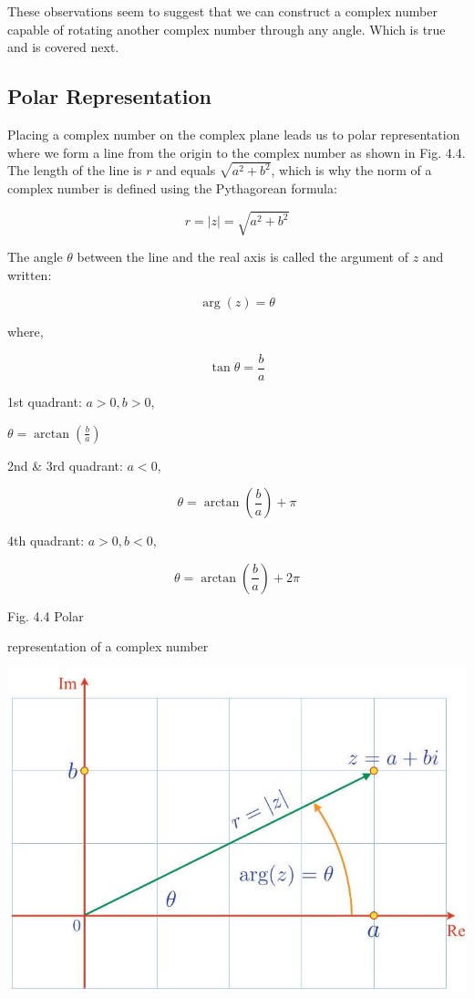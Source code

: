 \documentclass[10pt]{article}
\begin{document}
These observations seem to suggest that we can construct a complex number capable of rotating another complex number through any angle. Which is true and is covered next.

\subsection{Polar Representation}
Placing a complex number on the complex plane leads us to polar representation where we form a line from the origin to the complex number as shown in Fig. 4.4. The length of the line is $r$ and equals $\sqrt{a^{2}+b^{2}}$, which is why the norm of a complex number is defined using the Pythagorean formula:

$$
r=|z|=\sqrt{a^{2}+b^{2}}
$$

The angle $\theta$ between the line and the real axis is called the argument of $z$ and written:

$$
\arg (z)=\theta
$$

where,

$$
\tan \theta=\frac{b}{a}
$$

1st quadrant: $a>0, b>0$,

$\theta=\arctan \left(\frac{b}{a}\right)$

2nd \& 3rd quadrant: $a<0$,

$$
\theta=\arctan \left(\frac{b}{a}\right)+\pi
$$

4th quadrant: $a>0, b<0$,

$$
\theta=\arctan \left(\frac{b}{a}\right)+2 \pi
$$

Fig. 4.4 Polar

representation of a complex number

\begin{center}
\includegraphics[max width=\textwidth]{2023_04_20_41f1ceac5a31dc7d1b59g-072}
\end{center}
\end{document}
